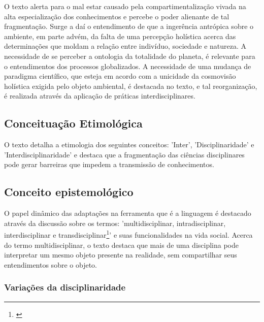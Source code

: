 \documentclass[
   article,       %
   12pt,          %
   oneside,       %
   a4paper,       %
   english,       %
   brazil,           %
   sumario=tradicional
   ]{abntex2}
\begin{document}
O texto alerta para o mal estar causado pela compartimentalização vivada na alta especialização dos conhecimentos e percebe o poder alienante de tal fragmentação. Surge a daí o entendimento de que a ingerência antrópica sobre o ambiente, em parte advém, da falta de uma percepção holística acerca das determinações que moldam a relação entre indivíduo, sociedade e natureza. A necessidade de se perceber a ontologia da totalidade do planeta, é relevante para o entendimentos dos processos globalizados. A necessidade de uma mudança de paradigma científico, que esteja em acordo com a unicidade da cosmovisão holística exigida pelo objeto ambiental, é destacada no texto, e tal reorganização, é realizada através da aplicação de práticas interdisciplinares.


\subsection{Conceituação Etimológica}

O texto detalha a etimologia dos seguintes conceitos: 'Inter', 'Disciplinaridade' e 'Interdisciplinaridade' e destaca que a fragmentação das ciências disciplinares pode gerar barreiras que impedem a transmissão de conhecimentos.


\subsection{Conceito epistemológico}

O papel dinâmico das adaptações na ferramenta que é a linguagem é destacado através da discussão sobre os termos: 'multidisciplinar, intradisciplinar,
interdisciplinar e transdisciplinar\footnote{\cite[p.57]{consideracoes_Interdisciplinaridade}}' e suas funcionalidades na vida social.
Acerca do termo multidisciplinar, o texto destaca que mais de uma disciplina pode interpretar um mesmo objeto presente na realidade, sem compartilhar seus entendimentos sobre o objeto.

\subsubsection{Variações da disciplinaridade}
\end{document}

